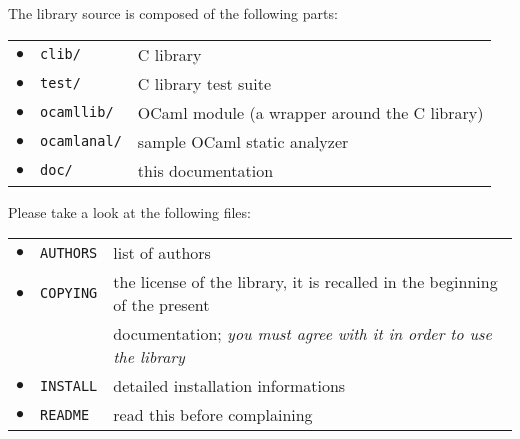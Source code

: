 \documentclass[twosides]{report}
\begin{document}
\noindent
The library source is composed of the following parts:\\
\begin{tabular}{lll}
$\bullet$ & {\tt clib/} & \qquad C library\\
$\bullet$ & {\tt test/} & \qquad C library test suite\\
$\bullet$ & {\tt ocamllib/} &\qquad OCaml module (a wrapper around the C library)\\
$\bullet$ & {\tt ocamlanal/} &\qquad sample OCaml static analyzer\\
$\bullet$ & {\tt doc/} &\qquad this documentation
\end{tabular}
\bigskip

\noindent
Please take a look at the following files:\\
\begin{tabular}{lll}
$\bullet$ & {\tt AUTHORS} &\qquad list of authors\\
$\bullet$ & {\tt COPYING} &\qquad the license of the library, it is recalled in the
beginning of the present\\&&\qquad documentation;
{\it you must agree with it in order to use the library}\\
$\bullet$ & {\tt INSTALL}  &\qquad detailed installation informations\\
$\bullet$ & {\tt README} &\qquad read this before complaining\\
\end{tabular}

\bigskip
\end{document}
